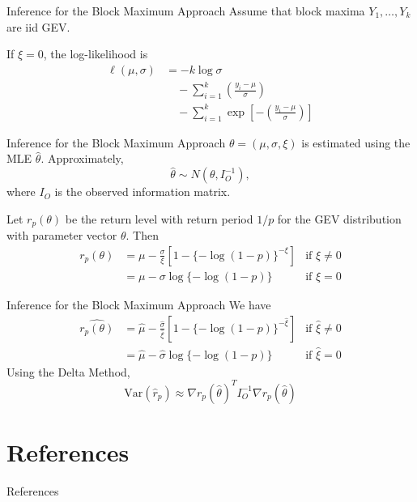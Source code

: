 \documentclass{beamer}
\begin{document}
\begin{frame}{Inference for the Block Maximum Approach}
    Assume that block maxima $Y_1, \ldots, Y_k$ are iid GEV.

    \medskip
    
    If $\xi = 0$, the log-likelihood is
    \begin{align*}
        \ell(\mu, \sigma) &= -k\log\sigma \\
        &\quad - \sum_{i = 1}^k \left(\frac{y_i - \mu}{\sigma}\right) \\
        &\quad - \sum_{i = 1}^k \exp\left[-\left(\frac{y_i - \mu}{\sigma}\right)\right]
    \end{align*}
\end{frame}

\begin{frame}{Inference for the Block Maximum Approach}
    $\theta = (\mu, \sigma, \xi)$ is estimated using the MLE $\hat{\theta}$. Approximately,
    \[
    \hat{\theta} \sim N(\theta, I_O^{-1}),
    \]
    where $I_O$ is the observed information matrix.

    Let $r_p(\theta)$ be the return level with return period $1 / p$ for the GEV distribution with parameter vector $\theta$. Then
    \begin{align*}
        r_p(\theta) &= \mu - \frac{\sigma}{\xi}[1 - \{-\log(1 - p)\}^{-\xi}] & \text{if $\xi \ne 0$} \\
        &= \mu - \sigma\log\{-\log(1 - p)\} & \text{if $\xi = 0$}
    \end{align*}
\end{frame}

\begin{frame}{Inference for the Block Maximum Approach}
    We have
    \begin{align*}
        \widehat{r_p(\theta)} &= \hat{\mu} - \frac{\hat{\sigma}}{\hat{\xi}}[1 - \{-\log(1 - p)\}^{-\hat{\xi}}] & \text{if $\hat{\xi} \ne 0$} \\
        &= \hat{\mu} - \hat{\sigma}\log\{-\log(1 - p)\} & \text{if $\hat{\xi} = 0$}
    \end{align*}
    Using the Delta Method,
    \[
    \text{Var}(\hat{r}_p) \approx \nabla r_p(\hat{\theta})^T I_O^{-1}\nabla r_p(\hat{\theta})
    \]
\end{frame}

\section{References}

\begin{frame}[allowframebreaks]{References}
    \nocite{*}
    \printbibliography
\end{frame}
\end{document}
